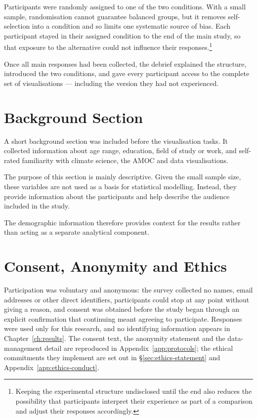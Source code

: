 Participants were randomly assigned to one of the two conditions. With a small sample, randomisation cannot guarantee balanced groups, but it removes self-selection into a condition and so limits one systematic source of bias. Each participant stayed in their assigned condition to the end of the main study, so that exposure to the alternative could not influence their responses.\footnote{Keeping the experimental structure undisclosed until the end also reduces the possibility that participants interpret their experience as part of a comparison and adjust their responses accordingly.}

Once all main responses had been collected, the debrief explained the structure, introduced the two conditions, and gave every participant access to the complete set of visualisations --- including the version they had not experienced.

\section{Background Section}
\label{sec:eval-demographics}

A short background section was included before the visualisation tasks. It collected information about age range, education, field of study or work, and self-rated familiarity with climate science, the AMOC and data visualisations.

The purpose of this section is mainly descriptive. Given the small sample size, these variables are not used as a basis for statistical modelling. Instead, they provide information about the participants and help describe the audience included in the study.

The demographic information therefore provides context for the results rather than acting as a separate analytical component.

\section{Consent, Anonymity and Ethics}
\label{sec:eval-ethics}

Participation was voluntary and anonymous: the survey collected no names, email addresses or other direct identifiers, participants could stop at any point without giving a reason, and consent was obtained before the study began through an explicit confirmation that continuing meant agreeing to participate. Responses were used only for this research, and no identifying information appears in Chapter~\ref{ch:results}. The consent text, the anonymity statement and the data-management detail are reproduced in Appendix~\ref{app:protocols}; the ethical commitments they implement are set out in \S\ref{sec:ethics-statement} and Appendix~\ref{app:ethics-conduct}.

